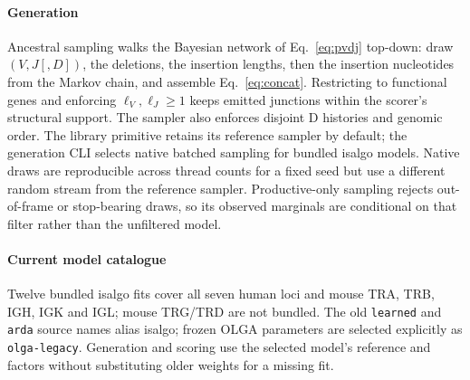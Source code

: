 \documentclass[11pt]{article}
\theoremstyle{oldplain}
\theoremstyle{oldrem}
\begin{document}
\paragraph{Generation} Ancestral sampling walks the Bayesian network of Eq.~\eqref{eq:pvdj} top-down:
draw $(V,J[,D])$, the deletions, the insertion lengths, then the insertion nucleotides from the Markov
chain, and assemble Eq.~\eqref{eq:concat}. Restricting to functional genes and enforcing $\ell_V,\ell_J\ge1$
keeps emitted junctions within the scorer's structural support.
The sampler also enforces disjoint D histories and genomic order.
The library primitive retains its reference sampler by default; the generation CLI
selects native batched sampling for bundled isalgo models.
Native draws are reproducible across thread counts for a fixed seed but use a
different random stream from the reference sampler.
Productive-only sampling rejects out-of-frame or stop-bearing draws, so its
observed marginals are conditional on that filter rather than the unfiltered model.

\paragraph{Current model catalogue} Twelve bundled isalgo fits cover all seven human
loci and mouse TRA, TRB, IGH, IGK and IGL; mouse TRG/TRD are not bundled.
The old \texttt{learned} and \texttt{arda} source names alias isalgo; frozen
OLGA parameters are selected explicitly as \texttt{olga-legacy}.
Generation and scoring use the selected model's reference and factors without
substituting older weights for a missing fit.
\end{document}
